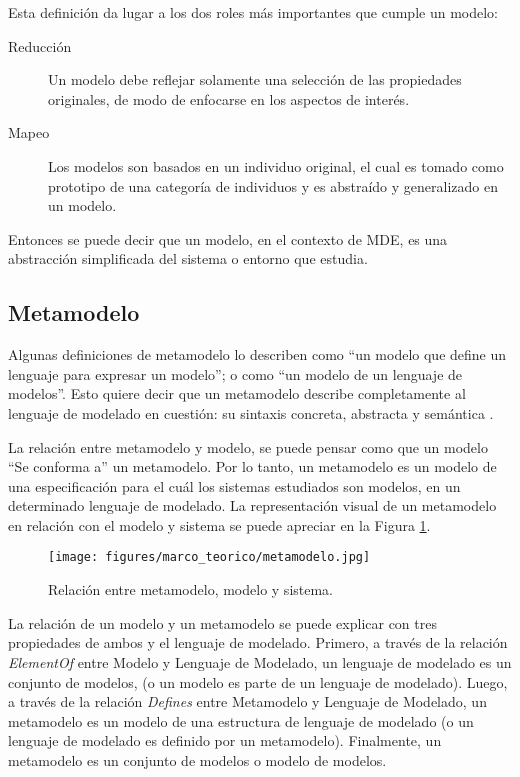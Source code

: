 Esta definición da lugar a los dos roles más importantes que cumple un modelo:
\begin{description}
\item[Reducción] Un modelo debe reflejar solamente una selección de las propiedades originales, de modo de enfocarse en los aspectos de interés.
\item[Mapeo] Los modelos son basados en un individuo original, el cual es tomado como prototipo de una categoría de individuos y es abstraído y generalizado en un modelo.
\end{description}
\cite{brambilla2012model}

Entonces se puede decir que un modelo, en el contexto de MDE, es una abstracción simplificada del sistema o entorno que estudia.

\subsection{Metamodelo}

Algunas definiciones de metamodelo lo describen como ``un modelo que define un lenguaje para expresar un modelo''; o como ``un modelo de un lenguaje de modelos''.
Esto quiere decir que un metamodelo describe completamente al lenguaje de modelado en cuestión: su sintaxis concreta, abstracta y semántica \cite{clark2015applied}.

La relación entre metamodelo y modelo, se puede pensar como que un modelo ``Se conforma a'' un metamodelo. \cite{bezivin2005unification}
Por lo tanto, un metamodelo es un modelo de una especificación para el cuál los sistemas estudiados son modelos, en un determinado lenguaje de modelado.
La representación visual de un metamodelo en relación con el modelo y sistema se puede apreciar en la Figura \ref{fig:marco:definicion_metamodelo}. \cite{da2015model}

\begin{figure}[htbp]
    \centering
    \texttt{[image: figures/marco\_teorico/metamodelo.jpg]}
    \caption{Relación entre metamodelo, modelo y sistema. \cite{da2015model}}
    \label{fig:marco:definicion_metamodelo}
\end{figure}

La relación de un modelo y un metamodelo se puede explicar con tres propiedades de ambos y el lenguaje de modelado. 
Primero, a través de la relación \textit{ElementOf} entre Modelo y Lenguaje de Modelado, un lenguaje de modelado es un conjunto de modelos, (o un modelo es parte de un lenguaje de modelado).
Luego, a través de la relación \textit{Defines} entre Metamodelo y Lenguaje de Modelado, un metamodelo es un modelo de una estructura de lenguaje de modelado (o un lenguaje de modelado es definido por un metamodelo). Finalmente, un metamodelo es un conjunto de modelos o modelo de modelos.

